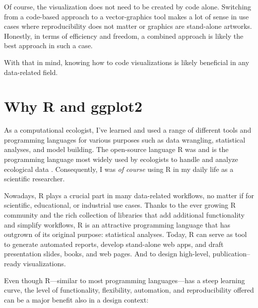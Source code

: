 \documentclass[
]{krantz}
\begin{document}
Of course, the visualization does not need to be created by code alone. Switching from a code-based approach to a vector-graphics tool makes a lot of sense in use cases where reproducibility does not matter or graphics are stand-alone artworks. Honestly, in terms of efficiency and freedom, a combined approach is likely the best approach in such a case.

With that in mind, knowing how to code visualizations is likely beneficial in any data-related field.

\hypertarget{why}{%
\section{\texorpdfstring{Why R and \textbf{ggplot2}}{Why R and ggplot2}}\label{why}}

As a computational ecologist, I've learned and used a range of different tools and programming languages for various purposes such as data wrangling, statistical analyses, and model building. The open-source language R was and is the programming language most widely used by ecologists to handle and analyze ecological data \citep{sciaini2018}. Consequently, I was \emph{of course} using R in my daily life as a scientific researcher.

Nowadays, R plays a crucial part in many data-related workflows, no matter if for scientific, educational, or industrial use cases. Thanks to the ever growing R community and the rich collection of libraries that add additional functionality and simplify workflows, R is an attractive programming language that has outgrown of its original purpose: statistical analyses. Today, R can serve as tool to generate automated reports, develop stand-alone web apps, and draft presentation slides, books, and web pages. And to design high-level, publication--ready visualizations.

Even though R---similar to most programming languages---has a steep learning curve, the level of functionality, flexibility, automation, and reproducibility offered can be a major benefit also in a design context:
\end{document}
